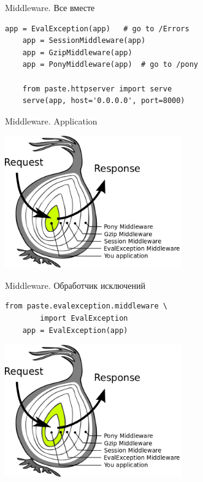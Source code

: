 \begin{frame}[fragile]{Middleware. Все вместе}
    \begin{lstlisting}[style=python]
    app = EvalException(app)   # go to /Errors
    app = SessionMiddleware(app)
    app = GzipMiddleware(app)
    app = PonyMiddleware(app)  # go to /pony

    from paste.httpserver import serve
    serve(app, host='0.0.0.0', port=8000)
    \end{lstlisting}
\end{frame}

\begin{frame}{Middleware. Application}

    \begin{center}
        \vspace{-0.35in}\includegraphics[width=3in]{media/wsgi-as-onion-app.png}
    \end{center}

\end{frame}

\begin{frame}[fragile]{Middleware. Обработчик исключений}
    \begin{lstlisting}[style=python]
    from paste.evalexception.middleware \
        import EvalException
    app = EvalException(app)
    \end{lstlisting}
    \begin{center}
        \includegraphics[width=3in]{media/wsgi-as-onion-evalexception.png}
    \end{center}
\end{frame}


